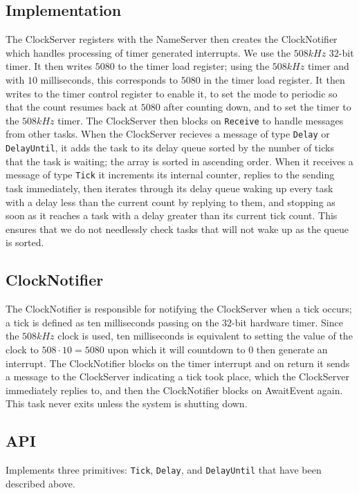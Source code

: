 \documentclass[12pt]{article}
\begin{document}
\subsection{Implementation}
The ClockServer registers with the NameServer then creates the ClockNotifier which handles processing of timer generated interrupts.  We use the $508kHz$ $32$-bit timer.  It then writes $5080$ to the timer load register; using the $508kHz$ timer and with $10$ milliseconds, this corresponds to $5080$ in the timer load register.  It then writes to the timer control register to enable it, to set the mode to periodic so that the count resumes back at $5080$ after counting down, and to set the timer to the $508kHz$ timer.  The ClockServer then blocks on \texttt{Receive} to handle messages from other tasks.  When the ClockServer recieves a message of type \texttt{Delay} or \texttt{DelayUntil}, it adds the task to its delay queue sorted by the number of ticks that the task is waiting; the array is sorted in ascending order.  When it receives a message of type \texttt{Tick} it increments its internal counter, replies to the sending task immediately, then iterates through its delay queue waking up every task with a delay less than the current count by replying to them, and stopping as soon as it reaches a task with a delay greater than its current tick count.  This ensures that we do not needlessly check tasks that will not wake up as the queue is sorted.
\\
\subsection{ClockNotifier}
The ClockNotifier is responsible for notifying the ClockServer when a tick occurs; a tick is defined as ten milliseconds passing on the $32$-bit hardware timer.  Since the $508kHz$ clock is used, ten milliseconds is equivalent to setting the value of the clock to $508\cdot 10 = 5080$ upon which it will countdown to $0$ then generate an interrupt.  The ClockNotifier blocks on the timer interrupt and on return it sends a message to the ClockServer indicating a tick took place, which the ClockServer immediately replies to, and then the ClockNotifier blocks on AwaitEvent again.  This task never exits unless the system is shutting down.
\\[1\baselineskip]
\subsection{API}
Implements three primitives: \texttt{Tick}, \texttt{Delay}, and \texttt{DelayUntil} that have been described above.
\\[2\baselineskip]
\end{document}
